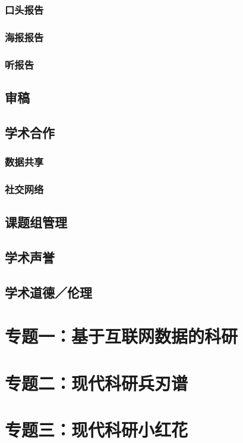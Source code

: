 \documentclass[]{book}
\begin{document}
\subsection{口头报告}

\subsection{海报报告}

\subsection{听报告}

\section{审稿}

\section{学术合作}

\subsection{数据共享}

\subsection{社交网络}

\section{课题组管理}

\section{学术声誉}

\section{学术道德／伦理}

\chapter{专题一：基于互联网数据的科研}

\chapter{专题二：现代科研兵刃谱}

\chapter{专题三：现代科研小红花}


\end{document}
